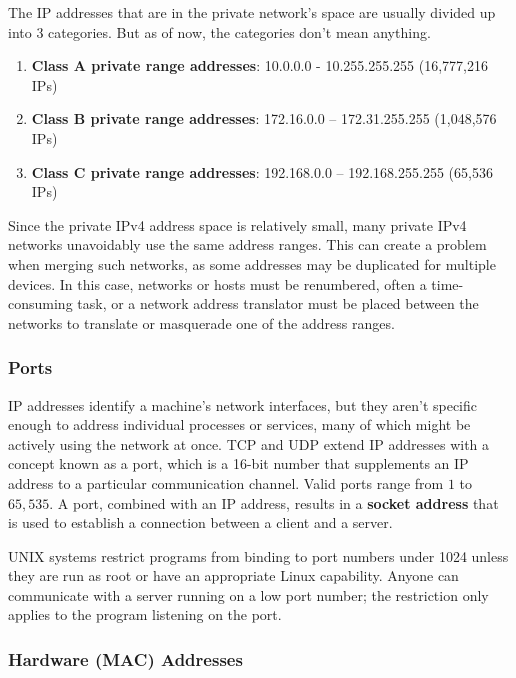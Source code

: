 \documentclass{article}
\begin{document}
      \begin{definition}
        The IP addresses that are in the private network's space are usually divided up into 3 categories. But as of now, the categories don't mean anything. 

        \begin{enumerate}
          \item \textbf{Class A private range addresses}: 10.0.0.0 - 10.255.255.255 (16,777,216 IPs)
          \item \textbf{Class B private range addresses}: 172.16.0.0 – 172.31.255.255 (1,048,576 IPs)
          \item \textbf{Class C private range addresses}: 192.168.0.0 – 192.168.255.255 (65,536 IPs)
        \end{enumerate}

        Since the private IPv4 address space is relatively small, many private IPv4 networks unavoidably use the same address ranges. This can create a problem when merging such networks, as some addresses may be duplicated for multiple devices. In this case, networks or hosts must be renumbered, often a time-consuming task, or a network address translator must be placed between the networks to translate or masquerade one of the address ranges. 
      \end{definition}


    \subsubsection{Ports}

      IP addresses identify a machine's network interfaces, but they aren't specific enough to address individual processes or services, many of which might be actively using the network at once. TCP and UDP extend IP addresses with a concept known as a port, which is a 16-bit number that supplements an IP address to a particular communication channel. Valid ports range from $1$ to $65,535$. A port, combined with an IP address, results in a \textbf{socket address} that is used to establish a connection between a client and a server. 

      UNIX systems restrict programs from binding to port numbers under 1024 unless they are run as root or have an appropriate Linux capability. Anyone can communicate with a server running on a low port number; the restriction only applies to the program listening on the port.

    \subsubsection{Hardware (MAC) Addresses}
\end{document}
